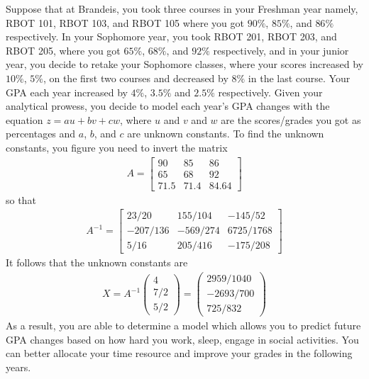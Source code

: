 \begin{example}
	Suppose that at Brandeis, you took three courses in your Freshman year namely, RBOT 101, RBOT 103, and RBOT 105 where you got $90\%$, $85\%$, and $86\%$ respectively. In your Sophomore year, you took  RBOT 201, RBOT 203, and RBOT 205, where you got $65\%$, $68\%$, and $92\%$ respectively, and in your junior year, you decide to retake your Sophomore classes, where your scores increased by $10\%$, $5\%$, on the first two courses and decreased by $8\%$ in the last course. Your GPA each year increased by $4\%$, $3.5\%$ and $2.5\%$  respectively. Given your analytical prowess, you decide to model each year's GPA changes with the equation $z = a u + b v + c w$, where $u$ and $v$ and $w$ are the scores/grades you got as percentages and $a$, $b$, and $c$ are unknown constants. To find the unknown constants, you figure you need to invert the matrix
	\begin{align}
		A = \begin{bmatrix}
			90 & 85 & 86 \\
			65 & 68 & 92 \\
			71.5 & 71.4 & 84.64
		\end{bmatrix}
	\end{align}
	so that 
	\begin{align}
	A^{-1} = \begin{bmatrix}
	23/20 & 155/104 & -145/52 \\
	-207/136 & -569/274 & 6725/1768 \\
	5/16 & 205/416 & -175/208
	\end{bmatrix}
	\end{align}
	It follows that the unknown constants are 
	\begin{align}
		X = A^{-1} \left(\begin{array}{c}
			4 \\ 7/2 \\ 5/2
		\end{array}\right) = \left(\begin{array}{c}
		2959/1040 \\ -2693/700 \\ 725/832
		\end{array}\right) 
	\end{align}
	As a result, you are able to determine a model which allows you to predict future GPA changes based on how hard you work, sleep, engage in social activities. You can better allocate your time resource and improve your grades in the following years.
	

\end{example}
